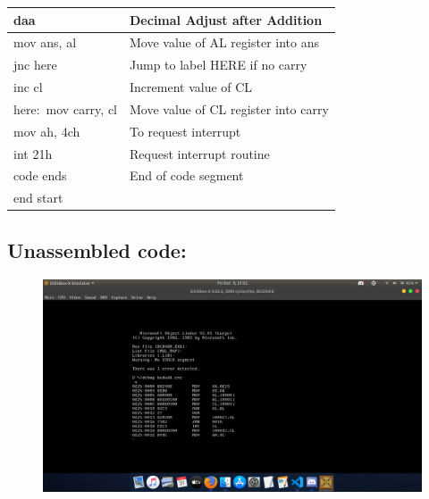 \documentclass[10pt,a4paper]{article}
\begin{document}
\begin{flushleft}
\begin{table}[htb]
{\begin{tabular}{|l|l|}
\hline
daa                                                              & Decimal Adjust after Addition                 \\
\hline
mov ans, al                                                      & Move value of AL register into ans            \\
\hline
jnc here                                                         & Jump to label HERE if no carry                \\
\hline
inc cl                                                           & Increment value of CL                         \\
\hline
here:~mov carry, cl                                              & Move value of CL register into carry          \\
\hline
mov ah, 4ch                                                      & To request interrupt                          \\
\hline
int 21h                                                          & Request interrupt routine                     \\ 
\hline
code ends                                                        & End of code segment                           \\
\hline
end start                                                        &                                               \\
\hline
\end{tabular}
}
\end{table}

\newpage
\subsection*{\textbf{Unassembled code:}}
\begin{figure}[h]
    \centering
    \includegraphics[trim = 100mm 60mm 200mm 120mm, clip, width = \textwidth]{Pics/BAUS.png}
\end{figure}

\end{flushleft}
\end{document}
